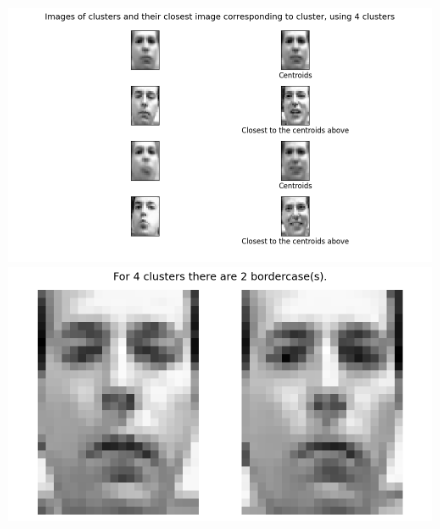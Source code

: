 \documentclass[12pt, letterpaper]{article}
\begin{document}
      \begin{figure}[H]
        \caption{}
        \centering
        \includegraphics[scale=0.7]{cluster4}
        \includegraphics[scale=0.4]{border4}
      \end{figure}\\
\end{document}
